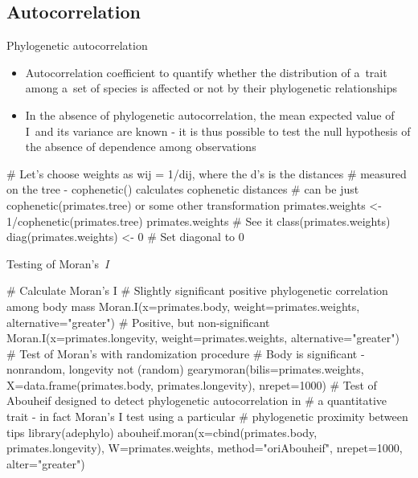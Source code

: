 \documentclass[compress, ucs, xelatex, 11pt, xcolor=svgnames,
  hyperref={
    bookmarks=true,
    unicode=true,
    colorlinks=true,
    pdftitle={Molecular data in R},
    plainpages=false,
    pdfauthor={Vojtech Zeisek},
    pdfsubject={Course about phylogeny and evolution in R},
    pdfcreator={XeLaTeX},
    pdfkeywords={R, evolution, phylogeny, molecular data},
    linkcolor=Tomato,
    anchorcolor=SaddleBrown,
    citecolor=Goldenrod,
    filecolor=DarkMagenta,
    menucolor=Sienna,
    urlcolor=DarkTurquoise,
    pdftex},
  url={hyphens, lowtilde} %
  ]{beamer}
\begin{document}
\subsection{Autocorrelation}

\begin{frame}[fragile]{Phylogenetic autocorrelation}
  \begin{itemize}
    \item Autocorrelation coefficient to quantify whether the distribution of a~trait among a~set of species is affected or not by their phylogenetic relationships
    \item In the absence of phylogenetic autocorrelation, the mean expected value of I~and its variance are known - it is thus possible to test the null hypothesis of the absence of dependence among observations
  \end{itemize}
  \begin{spluscode}
    # Let's choose weights as wij = 1/dij, where the d’s is the distances
    # measured on the tree - cophenetic() calculates cophenetic distances
    # can be just cophenetic(primates.tree) or some other transformation
    primates.weights <- 1/cophenetic(primates.tree)
    primates.weights # See it
    class(primates.weights)
    diag(primates.weights) <- 0 # Set diagonal to 0
\end{spluscode}
\end{frame}

\begin{frame}[fragile]{Testing of Moran's~\textit{I}}
  \begin{spluscode}
    # Calculate Moran's I
    # Slightly significant positive phylogenetic correlation among body mass
    Moran.I(x=primates.body, weight=primates.weights,
      alternative="greater")
    # Positive, but non-significant
    Moran.I(x=primates.longevity, weight=primates.weights,
      alternative="greater")
    # Test of Moran's with randomization procedure
    # Body is significant - nonrandom, longevity not (random)
    gearymoran(bilis=primates.weights, X=data.frame(primates.body,
      primates.longevity), nrepet=1000)
    # Test of Abouheif designed to detect phylogenetic autocorrelation in
    # a quantitative trait - in fact Moran's I test using a particular
    # phylogenetic proximity between tips
    library(adephylo)
    abouheif.moran(x=cbind(primates.body, primates.longevity),
      W=primates.weights, method="oriAbouheif", nrepet=1000,
      alter="greater")
  \end{spluscode}
\end{frame}
\end{document}
